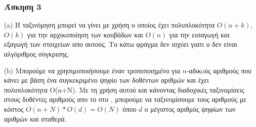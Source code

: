 \newpage
\subsubsection*{Άσκηση 3}

(a) Η ταξινόμηση μπορεί να γίνει με χρήση  ο οποίος έχει πολυπλοκότητα $O(n+k)$, $O(k)$ για την αρχικοποίηση των κουβάδων και $O(n)$ για την εισαγωγή και εξαγωγή των στοιχείων απο αυτούς.
Το κάτω φράγμα δεν ισχύει γιατι ο  δεν είναι αλγόριθμος σύγκρισης.

(b) Μπορούμε να χρησιμοποιήσουμε έναν τροποποιημένο για $n$-αδικoύς αριθμούς  που κάνει  με βάση ένα συγκεκριμένο ψηφίο των δοθέντων αριθμών και έχει πολυπλοκότητα Ο(n+N).
Με τη χρήση αυτού και κάνοντας διαδοχικές ταξινομίσεις στους δοθέντες αριθμούς απο το  στο , μπορούμε να ταξινομίσουμε τους αριθμούς με κόστος $O(n+N)*O(d) = O(N)$ όπου $d$ 
ο μέγιστος αριθμός ψηφίων των αριθμών και σταθερά.

